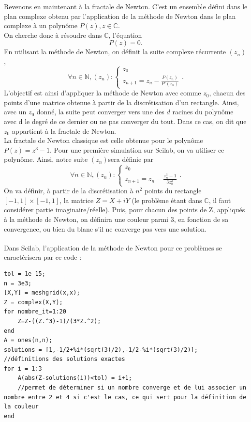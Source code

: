             Revenons en maintenant à la fractale de Newton. C'est un ensemble défini dans le plan complexe obtenu par l'application de la méthode de Newton dans le plan complexe à un polynôme $P(z), z\in \mathbb{C}$.
            \\ 
            On cherche donc à résoudre dans $\mathbb{C}$, l'équation
            $$P(z)=0.$$
            En utilisant la méthode de Newton, on définit la suite complexe récurrente $(z_n)$, 
            $$
            \forall n\in \mathbb{N}, (z_n) :
            \left\{
                \begin{array}{ll}
                    z_0\\
                    z_{n+1}=z_n-\frac{P(z_n)}{P'(z_n)}                    
                \end{array}
            \right..
            $$
        L'objectif est ainsi d'appliquer la méthode de Newton avec comme $z_0$, chacun des points d'une matrice obtenue à partir de la discrétisation d'un rectangle. Ainsi, avec un $z_0$ donné, la suite peut converger vers une des $d$ racines du polynôme avec d le degré de ce dernier ou ne pas converger du tout. Dans ce cas, on dit que $z_0$ appartient à la fractale de Newton. \\
        La fractale de Newton classique est celle obtenue pour le polynôme $P(z)=z^3-1$. Pour une première simulation sur Scilab, on va utiliser ce polynôme. Ainsi, notre suite $(z_n)$sera définie par
        $$
            \forall n\in \mathbb{N}, (z_n) :
            \left\{
                \begin{array}{ll}
                    z_0\\
                    z_{n+1}=z_n-\frac{z_n^3-1}{3z_n^2}                    
                \end{array}
            \right..
          $$
         On va définir, à partir de la discrétisation à $n^2$ points du rectangle $[-1, 1]\times [-1, 1]$, la matrice $Z=X+iY$ (le problème étant dans $\mathbb{C}$, il faut considérer partie imaginaire/réelle). Puis, pour chacun des points de Z, appliqués à la méthode de Newton, on définira une couleur parmi 3, en fonction de sa convergence, ou bien du blanc s'il ne converge pas vers une solution.
         \\
         \\
         Dans Scilab, l'application de la méthode de Newton pour ce problèmes se caractérisera par ce code :
         \begin{center}
                \begin{verbatim}
tol = 1e-15;
n = 3e3;
[X,Y] = meshgrid(x,x);
Z = complex(X,Y);
for nombre_it=1:20
    Z=Z-((Z.^3)-1)/(3*Z.^2);
end
A = ones(n,n);
solutions = [1,-1/2+%i*(sqrt(3)/2),-1/2-%i*(sqrt(3)/2)];
//définitions des solutions exactes
for i = 1:3
    A(abs(Z-solutions(i))<tol) = i+1;
    //permet de déterminer si un nombre converge et de lui associer un nombre entre 2 et 4 si c'est le cas, ce qui sert pour la définition de la couleur
end
                \end{verbatim}
               \label{lst:code_2}
            \end{center}
